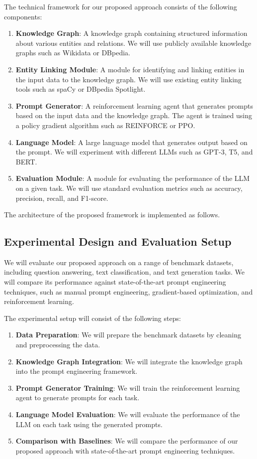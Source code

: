 \documentclass{article}
\begin{document}
The technical framework for our proposed approach consists of the following components:

\begin{enumerate}
    \item \textbf{Knowledge Graph}: A knowledge graph containing structured information about various entities and relations. We will use publicly available knowledge graphs such as Wikidata or DBpedia.
    \item \textbf{Entity Linking Module}: A module for identifying and linking entities in the input data to the knowledge graph. We will use existing entity linking tools such as spaCy or DBpedia Spotlight.
    \item \textbf{Prompt Generator}: A reinforcement learning agent that generates prompts based on the input data and the knowledge graph. The agent is trained using a policy gradient algorithm such as REINFORCE or PPO.
    \item \textbf{Language Model}: A large language model that generates output based on the prompt. We will experiment with different LLMs such as GPT-3, T5, and BERT.
    \item \textbf{Evaluation Module}: A module for evaluating the performance of the LLM on a given task. We will use standard evaluation metrics such as accuracy, precision, recall, and F1-score.
\end{enumerate}

The architecture of the proposed framework is implemented as follows.

\subsection{Experimental Design and Evaluation Setup}

We will evaluate our proposed approach on a range of benchmark datasets, including question answering, text classification, and text generation tasks. We will compare its performance against state-of-the-art prompt engineering techniques, such as manual prompt engineering, gradient-based optimization, and reinforcement learning.

The experimental setup will consist of the following steps:

\begin{enumerate}
    \item \textbf{Data Preparation}: We will prepare the benchmark datasets by cleaning and preprocessing the data.
    \item \textbf{Knowledge Graph Integration}: We will integrate the knowledge graph into the prompt engineering framework.
    \item \textbf{Prompt Generator Training}: We will train the reinforcement learning agent to generate prompts for each task.
    \item \textbf{Language Model Evaluation}: We will evaluate the performance of the LLM on each task using the generated prompts.
    \item \textbf{Comparison with Baselines}: We will compare the performance of our proposed approach with state-of-the-art prompt engineering techniques.
\end{enumerate}
\end{document}
